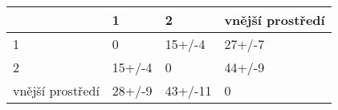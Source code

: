 \begin{tabular}{llll}
\toprule
{} &       1 &        2 & vnější prostředí \\
\midrule
1                &       0 &   15+/-4 &           27+/-7 \\
2                &  15+/-4 &        0 &           44+/-9 \\
vnější prostředí &  28+/-9 &  43+/-11 &                0 \\
\bottomrule
\end{tabular}
